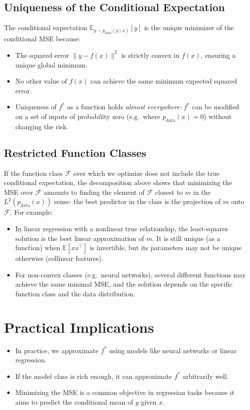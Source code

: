 \begin{notechapter}
\subsection{Uniqueness of the Conditional Expectation}
The conditional expectation \( \mathbb{E}_{y \sim p_{\text{data}}(y \mid x)} [y] \) is the unique minimizer of the conditional MSE because:
\begin{itemize}
    \item The squared error \( \| y - f(x) \|^2 \) is strictly convex in \( f(x) \), ensuring a unique global minimum.
    \item No other value of \( f(x) \) can achieve the same minimum expected squared error.
    \item Uniqueness of \( f^* \) as a function holds \emph{almost everywhere}: \( f^* \) can be modified on a set of inputs of probability zero (e.g.\ where \( p_{\text{data}}(x) = 0 \)) without changing the risk.
\end{itemize}

\subsection{Restricted Function Classes}
If the function class \( \mathcal{F} \) over which we optimize does not include the true conditional expectation, the decomposition above shows that minimizing the MSE over \( \mathcal{F} \) amounts to finding the element of \( \mathcal{F} \) closest to \( m \) in the \( L^2(p_{\text{data}}(x)) \) sense: the best predictor in the class is the projection of \( m \) onto \( \mathcal{F} \). For example:
\begin{itemize}
    \item In linear regression with a nonlinear true relationship, the least-squares solution is the best linear approximation of \( m \). It is still unique (as a function) when \( \mathbb{E}[x x^\top] \) is invertible, but its parameters may not be unique otherwise (collinear features).
    \item For non-convex classes (e.g.\ neural networks), several different functions may achieve the same minimal MSE, and the solution depends on the specific function class and the data distribution.
\end{itemize}

\section{Practical Implications}
\begin{itemize}
    \item In practice, we approximate \( f^* \) using models like neural networks or linear regression.
    \item If the model class is rich enough, it can approximate \( f^* \) arbitrarily well.
    \item Minimizing the MSE is a common objective in regression tasks because it aims to predict the conditional mean of \( y \) given \( x \).
\end{itemize}


\end{notechapter}
